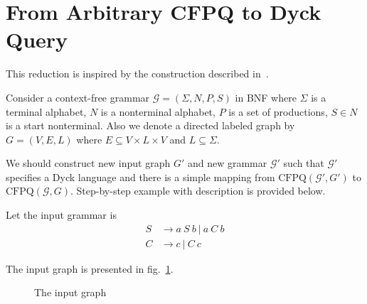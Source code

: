 \section{From Arbitrary CFPQ to Dyck Query}

This reduction is inspired by the construction described in~\cite{OptimalDLR}.

Consider a context-free grammar $\mathcal{G}=(\Sigma, N, P, S)$ in BNF where $\Sigma$ is a terminal alphabet, $N$ is 
a nonterminal alphabet, $P$ is a set of productions, $S \in N$ is a start nonterminal.
Also we denote a directed labeled graph by $G=(V,E,L)$ where $E \subseteq V \times L \times V$ and $L \subseteq \Sigma$. 

We should construct new input graph $G'$ and new grammar $\mathcal{G'}$ such that $\mathcal{G'}$ specifies a Dyck language and there is a simple mapping from $\text{CFPQ}(\mathcal{G'}, G')$ to $\text{CFPQ}(\mathcal{G}, G)$.
Step-by-step example with description is provided below.
 
Let the input grammar is 
\begin{align*}
S & \rightarrow a \ S \ b \ | \ a \ C \ b 
\\
C & \rightarrow c \ | \ C \ c
\end{align*}

The input graph is presented in fig.~\ref{input}.

\begin{figure}
\resizebox{.5\textwidth}{!}
{
}
\label{input}
\caption{The input graph}

\end{figure}

